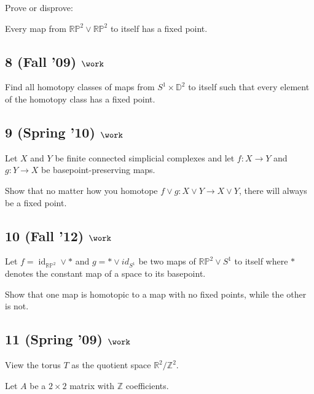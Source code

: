 Prove or disprove:

Every map from \({\mathbb{RP}}^2 \lor {\mathbb{RP}}^2\) to itself has a
fixed point.

\hypertarget{fall-09-work-1}{%
\subsection{\texorpdfstring{8 (Fall '09)
\(\work\)}{8 (Fall '09) \textbackslash work}}\label{fall-09-work-1}}

Find all homotopy classes of maps from \(S^1 \times {\mathbb{D}}^2\) to
itself such that every element of the homotopy class has a fixed point.

\hypertarget{spring-10-work}{%
\subsection{\texorpdfstring{9 (Spring '10)
\(\work\)}{9 (Spring '10) \textbackslash work}}\label{spring-10-work}}

Let \(X\) and \(Y\) be finite connected simplicial complexes and let
\(f : X \to Y\) and \(g : Y \to X\) be basepoint-preserving maps.

Show that no matter how you homotope
\(f \lor g : X \lor Y \to X \lor Y\), there will always be a fixed
point.

\hypertarget{fall-12-work-3}{%
\subsection{\texorpdfstring{10 (Fall '12)
\(\work\)}{10 (Fall '12) \textbackslash work}}\label{fall-12-work-3}}

Let \(f = \operatorname{id}_{{\mathbb{RP}}^2} \lor \ast\) and
\(g = \ast \lor id_{S^1}\) be two maps of \({\mathbb{RP}}^2 \lor S^1\)
to itself where \(\ast\) denotes the constant map of a space to its
basepoint.

Show that one map is homotopic to a map with no fixed points, while the
other is not.

\hypertarget{spring-09-work-7}{%
\subsection{\texorpdfstring{11 (Spring '09)
\(\work\)}{11 (Spring '09) \textbackslash work}}\label{spring-09-work-7}}

View the torus \(T\) as the quotient space
\({\mathbb{R}}^2 /{\mathbb{Z}}^2\).

Let \(A\) be a \(2 \times 2\) matrix with \({\mathbb{Z}}\) coefficients.

